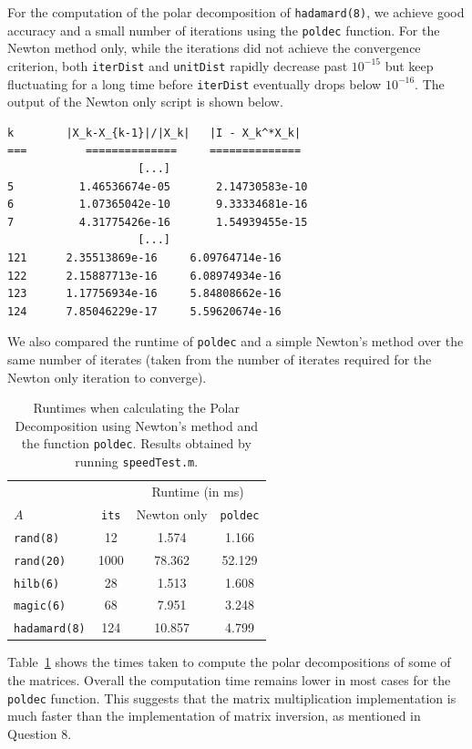 \documentclass[10pt, A4paper]{article}
\begin{document}
For the computation of the polar decomposition of \texttt{hadamard(8)}, 
we achieve good accuracy and a small number of iterations using the 
\texttt{poldec} function. For the Newton method only, while the 
iterations did not achieve the convergence criterion, both 
\texttt{iterDist} and \texttt{unitDist} rapidly decrease past 
$10^{-15}$ but keep fluctuating for a long time before 
\texttt{iterDist} eventually drops below $10^{-16}$. The output of the 
Newton only script is shown below.
\begin{verbatim}
k   	 |X_k-X_{k-1}|/|X_k|   |I - X_k^*X_k|
=== 	    ==============     ==============
                    [...]
5	       1.46536674e-05	    2.14730583e-10
6	       1.07365042e-10	    9.33334681e-16
7	       4.31775426e-16	    1.54939455e-15
                    [...]
121	     2.35513869e-16	    6.09764714e-16
122	     2.15887713e-16	    6.08974934e-16
123      1.17756934e-16	    5.84808662e-16
124      7.85046229e-17	    5.59620674e-16
\end{verbatim}

We also compared the runtime of \texttt{poldec} and a simple Newton's 
method over the same number of iterates (taken from the number of 
iterates required for the Newton only iteration to converge).
\begin{table}[b]
	\centering
	\begin{tabular}{ l c c c }
		\toprule
		& &\multicolumn{2}{c}{Runtime (in ms)} \\
		\cmidrule(lr){3-4}
		$A$ & \texttt{its} & Newton only & \texttt{poldec} \\
		\midrule
		\texttt{rand(8)}     & 12   & 1.574  & 1.166  \\
		\texttt{rand(20)}    & 1000 & 78.362 & 52.129 \\
		\texttt{hilb(6)}     & 28   & 1.513  & 1.608  \\
		\texttt{magic(6)}    & 68   & 7.951  & 3.248  \\
		\texttt{hadamard(8)} & 124  & 10.857 & 4.799  \\
		\bottomrule
	\end{tabular}
	\caption{
	Runtimes when calculating the Polar Decomposition using 
	Newton's method and the function \texttt{poldec}. Results obtained 
	by running \texttt{speedTest.m}.
	\label{tab:runtimes}}
\end{table}
Table~\ref{tab:runtimes} shows the times taken to compute the polar 
decompositions of some of the matrices. Overall the computation time 
remains lower in most cases for the \texttt{poldec} function.
This suggests that the matrix multiplication implementation is 
much faster than the implementation of matrix inversion, as mentioned 
in Question 8.
\end{document}
